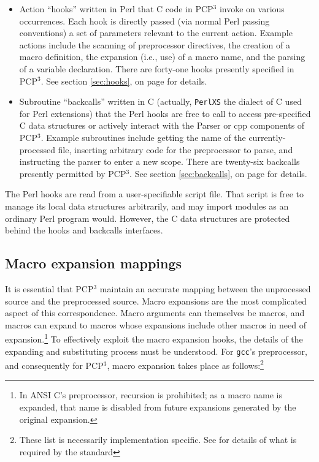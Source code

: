 \documentclass{article}
\newcommand{\pcp}{\mbox{\textsf{PCP}$^3$}}
\newcommand{\Cpp}{\mbox{\textsf{cpp}}}
\newcommand{\Perl}{\mbox{\textsf{Perl}}}
\newcommand{\C}{\mbox{\textsf{C}}}
\newcommand{\sectionref}[1]{section \ref{#1}, on page \pageref{#1}}
\newcommand{\ie}{i.e.,}
\begin{document}
\begin{itemize}
\item Action ``hooks'' written in \Perl{} that \C{} code in \pcp{}
      invoke on various occurrences. Each hook is directly passed (via
      normal \Perl{} passing conventions) a set of parameters relevant
      to the current action.  Example actions include the scanning of
      preprocessor directives, the creation of a macro definition, the
      expansion (\ie{} use) of a macro name, and the parsing of a
      variable declaration.  There are forty-one hooks presently
      specified in \pcp{}. See \sectionref{sec:hooks} for details.
\item Subroutine ``backcalls'' written in \C{} (actually,
      \texttt{PerlXS} the dialect of \C{} used for \Perl{} extensions)
      that the \Perl{} hooks are free to call to access pre-specified
      \C{} data structures or actively interact with the Parser or
      \Cpp{} components of \pcp{}.  Example subroutines include getting
      the name of the currently-processed file, inserting arbitrary code
      for the preprocessor to parse, and instructing the parser to enter
      a new scope.  There are twenty-six backcalls presently permitted
      by \pcp{}.  See \sectionref{sec:backcalls} for details.
\end{itemize}

\noindent The \Perl{} hooks are read from a user-specifiable script
file.  That script is free to manage its local data structures
arbitrarily, and may import modules as an ordinary \Perl{} program
would.  However, the \C{} data structures are protected behind the hooks
and backcalls interfaces.

\subsection{Macro expansion mappings}
It is essential that \pcp{} maintain an accurate mapping between the
unprocessed source and the preprocessed source.  Macro expansions are
the most complicated aspect of this correspondence.  Macro arguments can
themselves be macros, and macros can expand to macros whose expansions
include other macros in need of expansion.\footnote{In ANSI \C{}'s
  preprocessor, recursion is prohibited; as a macro name is expanded,
  that name is disabled from future expansions generated by the original
  expansion.}  To effectively exploit the macro expansion hooks, the
details of the expanding and substituting process must be understood.
For \texttt{gcc}'s preprocessor, and consequently for \pcp{}, macro
expansion takes place as follows:\footnote{These list is necessarily
  implementation specific.  See \cite[Ch.~3]{Harbison91} for details of
  what is required by the standard}
\end{document}
